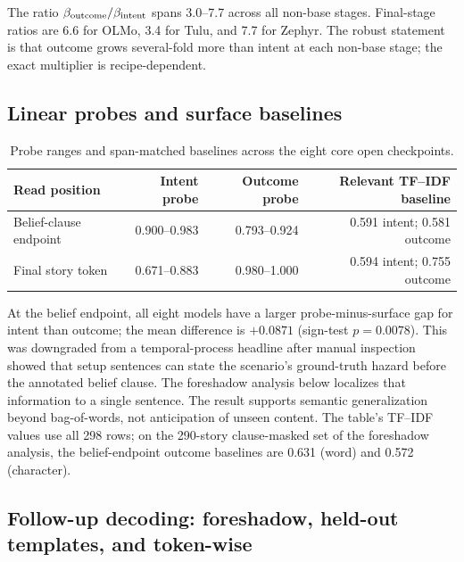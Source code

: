 The ratio $\beta_{\mathrm{outcome}}/\beta_{\mathrm{intent}}$ spans 3.0--7.7 across all non-base stages.
Final-stage ratios are 6.6 for OLMo, 3.4 for Tulu, and 7.7 for Zephyr.
The robust statement is that outcome grows several-fold more than intent at each non-base stage; the exact multiplier is recipe-dependent.

\subsection{Linear probes and surface baselines}

\begin{table}[h]
\centering
\small
\caption{Probe ranges and span-matched baselines across the eight core open checkpoints.}
\label{tab:probe-summary}
\begin{tabular}{@{}lrrr@{}}
\toprule
Read position & Intent probe & Outcome probe & Relevant TF--IDF baseline \\
\midrule
Belief-clause endpoint & 0.900--0.983 & 0.793--0.924 & 0.591 intent; 0.581 outcome \\
Final story token & 0.671--0.883 & 0.980--1.000 & 0.594 intent; 0.755 outcome \\
\bottomrule
\end{tabular}
\end{table}

At the belief endpoint, all eight models have a larger probe-minus-surface gap for intent than outcome; the mean difference is $+0.0871$ (sign-test $p=0.0078$).
This was downgraded from a temporal-process headline after manual inspection showed that setup sentences can state the scenario's ground-truth hazard before the annotated belief clause.
The foreshadow analysis below localizes that information to a single sentence.
The result supports semantic generalization beyond bag-of-words, not anticipation of unseen content.
The table's TF--IDF values use all 298 rows; on the 290-story clause-masked set of the foreshadow analysis, the belief-endpoint outcome baselines are 0.631 (word) and 0.572 (character).

\subsection{Follow-up decoding: foreshadow, held-out templates, and token-wise}
\label{sec:supp-foreshadow}

